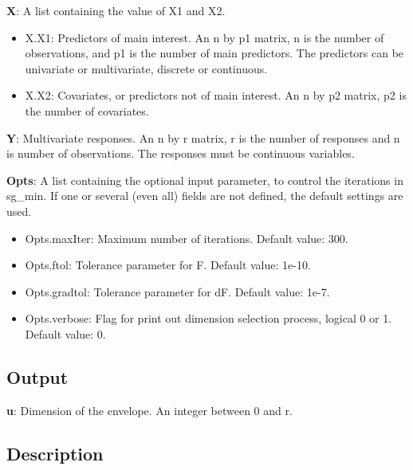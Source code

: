 \documentclass[a4paper,11pt,openany]{memoir}
\begin{document}
\begin{par}
\textbf{X}: A list containing the value of X1 and X2.
\end{par} \vspace{1em}
\begin{itemize}
\setlength{\itemsep}{-1ex}
   \item X.X1: Predictors of main interest. An n by p1 matrix, n is the number of observations, and p1 is the number of main predictors. The predictors can be univariate or multivariate, discrete or continuous.
   \item X.X2: Covariates, or predictors not of main interest.  An n by p2 matrix, p2 is the number of covariates.
\end{itemize}
\begin{par}
\textbf{Y}: Multivariate responses. An n by r matrix, r is the number of responses and n is number of observations. The responses must be continuous variables.
\end{par} \vspace{1em}
\begin{par}
\textbf{Opts}: A list containing the optional input parameter, to control the iterations in sg\_min. If one or several (even all) fields are not defined, the default settings are used.
\end{par} \vspace{1em}
\begin{itemize}
\setlength{\itemsep}{-1ex}
   \item Opts.maxIter: Maximum number of iterations.  Default value: 300.
   \item Opts.ftol: Tolerance parameter for F.  Default value: 1e-10.
   \item Opts.gradtol: Tolerance parameter for dF.  Default value: 1e-7.
   \item Opts.verbose: Flag for print out dimension selection process, logical 0 or 1. Default value: 0.
\end{itemize}


\subsection*{Output}

\begin{par}
\textbf{u}: Dimension of the envelope. An integer between 0 and r.
\end{par} \vspace{1em}


\subsection*{Description}
\end{document}
